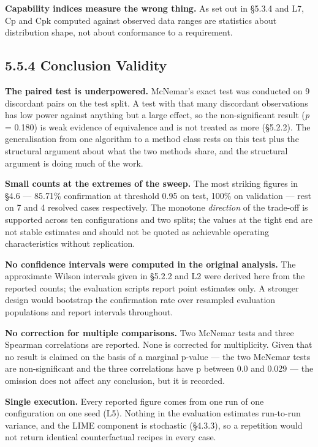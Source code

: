 \textbf{Capability indices measure the wrong thing.} As set out in §5.3.4 and L7, Cp and Cpk computed against observed data ranges are statistics about distribution shape, not about conformance to a requirement.

\hypertarget{conclusion-validity}{%
\subsection{5.5.4 Conclusion Validity}\label{conclusion-validity}}

\textbf{The paired test is underpowered.} McNemar's exact test was conducted on 9 discordant pairs on the test split. A test with that many discordant observations has low power against anything but a large effect, so the non-significant result (\emph{p} = 0.180) is weak evidence of equivalence and is not treated as more (§5.2.2). The generalisation from one algorithm to a method class rests on this test plus the structural argument about what the two methods share, and the structural argument is doing much of the work.

\textbf{Small counts at the extremes of the sweep.} The most striking figures in §4.6 --- 85.71\% confirmation at threshold 0.95 on test, 100\% on validation --- rest on 7 and 4 resolved cases respectively. The monotone \emph{direction} of the trade-off is supported across ten configurations and two splits; the values at the tight end are not stable estimates and should not be quoted as achievable operating characteristics without replication.

\textbf{No confidence intervals were computed in the original analysis.} The approximate Wilson intervals given in §5.2.2 and L2 were derived here from the reported counts; the evaluation scripts report point estimates only. A stronger design would bootstrap the confirmation rate over resampled evaluation populations and report intervals throughout.

\textbf{No correction for multiple comparisons.} Two McNemar tests and three Spearman correlations are reported. None is corrected for multiplicity. Given that no result is claimed on the basis of a marginal p-value --- the two McNemar tests are non-significant and the three correlations have p between 0.0 and 0.029 --- the omission does not affect any conclusion, but it is recorded.

\textbf{Single execution.} Every reported figure comes from one run of one configuration on one seed (L5). Nothing in the evaluation estimates run-to-run variance, and the LIME component is stochastic (§4.3.3), so a repetition would not return identical counterfactual recipes in every case.

